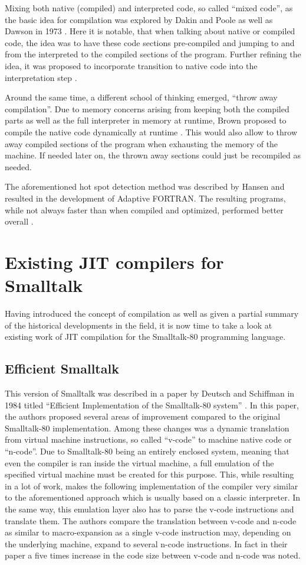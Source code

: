 Mixing both native (compiled) and interpreted code, so called \enquote{mixed code}, as the basic idea for \jit{} compilation was explored by Dakin and Poole as well as Dawson in 1973 \cites{Dakin1973, Dawson1973}.
Here it is notable, that when talking about native or compiled code, the idea was to have these code sections pre-compiled and jumping to and from the interpreted to the compiled sections of the program. 
Further refining the idea, it was proposed to incorporate transition to native code into the interpretation step \cite{Pittman1987}.

Around the same time, a different school of thinking emerged, \enquote{throw away compilation}. Due to memory concerns arising from keeping both the compiled parts as well as the full interpreter in memory at runtime, Brown proposed to compile the native code dynamically at runtime \cite{Brown1976}.
This would also allow to throw away compiled sections of the program when exhausting the memory of the machine. If needed later on, the thrown away sections could just be recompiled as needed. 

The aforementioned hot spot detection method was described by Hansen and resulted in the development of Adaptive FORTRAN. 
The resulting programs, while not always faster than when compiled and optimized, performed better overall \cite{Hansen1974}.

\section{Existing JIT compilers for Smalltalk}
Having introduced the concept of \jit{} compilation as well as given a partial summary of the historical developments in the field, it is now time to take a look at existing work of JIT compilation for the Smalltalk-80 programming language. 

\subsection{Efficient Smalltalk}
This version of Smalltalk was described in a paper by Deutsch and Schiffman in 1984 titled \enquote{Efficient Implementation of the Smalltalk-80 system} \cite{Deutsch1984}.
In this paper, the authors proposed several areas of improvement compared to the original Smalltalk-80 implementation. 
Among these changes was a dynamic translation from virtual machine instructions, so called \enquote{v-code} to machine native code or \enquote{n-code}. 
Due to Smalltalk-80 being an entirely enclosed system, meaning that even the compiler is ran inside the virtual machine, a full emulation of the specified virtual machine must be created for this purpose. 
This, while resulting in a lot of work, makes the following implementation of the \jit{} compiler very similar to the aforementioned approach which is usually based on a classic interpreter. In the same way, this emulation layer also has to parse the v-code instructions and translate them. 
The authors compare the translation between v-code and n-code as similar to macro-expansion as a single v-code instruction may, depending on the underlying machine, expand to several n-code instructions. In fact in their paper a five times increase in the code size between v-code and n-code was noted.

